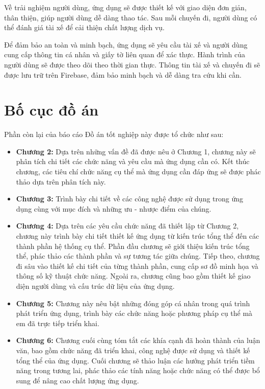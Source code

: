 \documentclass[../DoAn.tex]{subfiles}
\begin{document}
Về trải nghiệm người dùng, ứng dụng sẽ được thiết kế với giao diện đơn giản, thân 
thiện, giúp người dùng dễ dàng thao tác. Sau mỗi chuyến đi, người dùng có thể đánh 
giá tài xế để cải thiện chất lượng dịch vụ.

Để đảm bảo an toàn và minh bạch, ứng dụng sẽ yêu cầu tài xế và người dùng cung cấp 
thông tin cá nhân và giấy tờ liên quan để xác thực. Hành trình của người dùng sẽ được 
theo dõi theo thời gian thực. Thông tin tài xế và chuyến đi sẽ được lưu trữ trên Firebase, 
đảm bảo minh bạch và dễ dàng tra cứu khi cần.

\section{Bố cục đồ án}
\label{section:1.4}
Phần còn lại của báo cáo Đồ án tốt nghiệp này được tổ chức như sau: 

\begin{itemize}
  \item \textbf{Chương 2:} Dựa trên những vấn đề đã được nêu ở Chương 1, chương này sẽ phân tích chi tiết các chức năng và yêu cầu mà ứng dụng cần có. Kết thúc chương, các tiêu chí chức năng cụ thể mà ứng dụng cần đáp ứng sẽ được phác thảo dựa trên phân tích này.
  \item \textbf{Chương 3:} Trình bày chi tiết về các công nghệ được sử dụng trong ứng dụng cùng với mục đích và những ưu - nhược điểm của chúng.
  \item \textbf{Chương 4:} Dựa trên các yêu cầu chức năng đã thiết lập từ Chương 2, chương này trình bày chi tiết thiết kế ứng dụng từ kiến trúc tổng thể đến các thành phần hệ thống cụ thể. Phần đầu chương sẽ giới thiệu kiến trúc tổng thể, phác thảo các thành phần và sự tương tác giữa chúng. Tiếp theo, chương đi sâu vào thiết kế chi tiết của từng thành phần, cung cấp sơ đồ minh họa và thông số kỹ thuật chức năng. Ngoài ra, chương cũng bao gồm thiết kế giao diện người dùng và cấu trúc dữ liệu của ứng dụng.
  \item \textbf{Chương 5:} Chương này nêu bật những đóng góp cá nhân trong quá trình phát triển ứng dụng, trình bày các chức năng hoặc phương pháp cụ thể mà em đã trực tiếp triển khai.
  \item \textbf{Chương 6:} Chương cuối cùng tóm tắt các khía cạnh đã hoàn thành của luận văn, bao gồm chức năng đã triển khai, công nghệ được sử dụng và thiết kế tổng thể của ứng dụng. Cuối chương sẽ thảo luận các hướng phát triển tiềm năng trong tương lai, phác thảo các tính năng hoặc chức năng có thể được bổ sung để nâng cao chất lượng ứng dụng.
\end{itemize}
\end{document}

